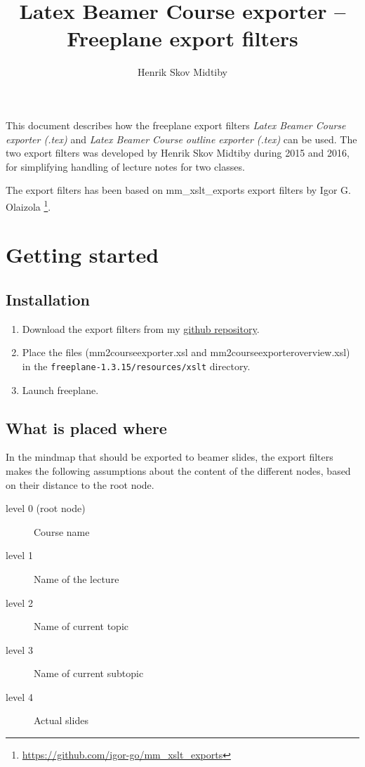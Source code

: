 \documentclass{article}
\title{Latex Beamer Course exporter -- Freeplane export filters}
\author{Henrik Skov Midtiby}
\begin{document}
\maketitle

This document describes how the freeplane export filters 
\emph{Latex Beamer Course exporter (.tex)} and 
\emph{Latex Beamer Course outline exporter (.tex)} can be used.
The two export filters was developed by Henrik Skov Midtiby
during 2015 and 2016, for simplifying handling of lecture
notes for two classes.


The export filters has been based on mm\_xslt\_exports
export filters by Igor G. Olaizola
\footnote{\url{https://github.com/igor-go/mm_xslt_exports}}.

\section{Getting started}

\subsection{Installation}

\begin{enumerate}
\item	Download the export filters from my
\href{https://github.com/henrikmidtiby/TeacherTools/tree/master/freeplane%20export%20filters}{github repository}.
\item	Place the files (mm2courseexporter.xsl and mm2courseexporteroverview.xsl) in the \texttt{freeplane-1.3.15/resources/xslt} directory.
\item	Launch freeplane.
\end{enumerate}

\subsection{What is placed where}

In the mindmap that should be exported to beamer slides, 
the export filters makes the following assumptions about
the content of the different nodes, based on their distance 
to the root node.
\begin{description}
\item[level 0 (root node)] Course name	
\item[level 1]	Name of the lecture
\item[level 2]	Name of current topic
\item[level 3] 	Name of current subtopic
\item[level 4]	Actual slides 	
\end{description}
\end{document}

